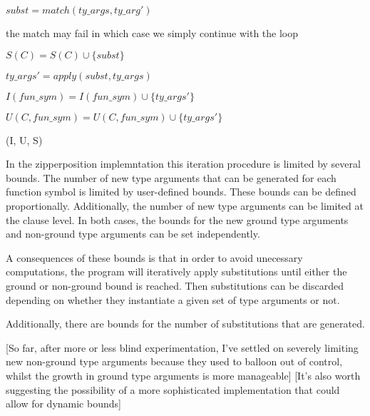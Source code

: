 \documentclass{article}
\begin{document}
\begin{algorithm}[tbh]
\begin{algorithmic}[1]
            
            \State \(subst = match(ty\_args, ty\_arg')\)

            \State \Comment the match may fail in which case we simply continue with the loop

            \State \(S(C) = S(C) \cup \{subst\}\)
         \EndFor
      \EndFor
   
   \EndFor

            \State \(ty\_args' = apply(subst, ty\_args)\)


               \State \(I(fun\_sym) = I(fun\_sym) \cup \{ty\_args'\}\)
            \Else

               \State \(U(C, fun\_sym) = U(C, fun\_sym) \cup \{ty\_args'\}\)
            \EndIf

         \EndFor
      \EndFor
   \EndFor

   \State \Return (I, U, S)

\EndFunction
\end{algorithmic}
\end{algorithm}
In the zipperposition implemntation this iteration procedure is limited by several bounds. The number of new type arguments that can be generated for each function symbol is limited by user-defined bounds. These bounds can be defined proportionally. Additionally, the number of new type arguments can be limited at the clause level. In both cases, the bounds for the new ground type arguments and non-ground type arguments can be set independently.

A consequences of these bounds is that in order to avoid unecessary computations, the program will iteratively apply substitutions until either the ground or non-ground bound is reached. Then substitutions can be discarded depending on whether they instantiate a given set of type arguments or not.

Additionally, there are bounds for the number of substitutions that are generated.

[So far, after more or less blind experimentation, I've settled on severely limiting new non-ground type arguments because they used to balloon out of control, whilst the growth in ground type arguments is more manageable]
[It's also worth suggesting the possibility of a more sophisticated implementation that could allow for dynamic bounds]
\end{document}
